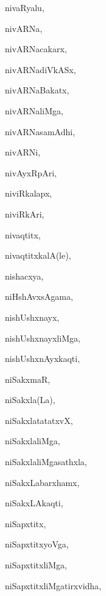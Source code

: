 \begin{multicols}{3}
{\noindent
{nivaRyalu}, \pageref{nivaRyalu}

\noindent
{nivARNa}, \pageref{nivARNa}

\noindent
{nivARNacakarx}, \pageref{nivARNacakarx}

\noindent
{nivARNadiVkASx}, \pageref{nivARNadiVkASx}

\noindent
{nivARNaBakatx}, \pageref{nivARNaBakatx}

\noindent
{nivARNaliMga}, \pageref{nivARNaliMga}

\noindent
{nivARNasamAdhi}, \pageref{nivARNasamAdhi}

\noindent
{nivARNi}, \pageref{nivARNi}

\noindent
{nivAyxRpAri}, \pageref{nivAyxRpAri}

\noindent
{niviRkalapx}, \pageref{niviRkalapx}

\noindent
{niviRkAri}, \pageref{niviRkAri}

\noindent
{nivaqtitx}, \pageref{nivaqtitx}

\noindent
{nivaqtitxkalA(le)}, \pageref{nivaqtitxkalAle}

\noindent
{nishacxya}, \pageref{nishacxya}

\noindent
{niHshAvxsAgama}, \pageref{niHshAvxsAgama}

\noindent
{nishUshxnayx}, \pageref{nishUshxnayx}

\noindent
{nishUshxnayxliMga}, \pageref{nishUshxnayxliMga}

\noindent
{nishUshxnAyxkaqti}, \pageref{nishUshxnAyxkaqti}

\noindent
{niSakxmaR}, \pageref{niSakxmaR}

\noindent
{niSakxla(La)}, \pageref{niSakxlaLa}

\noindent
{niSakxlatatatxvX}, \pageref{niSakxlatatatxvX}

\noindent
{niSakxlaliMga}, \pageref{niSakxlaliMga}

\noindent
{niSakxlaliMgasathxla}, \pageref{niSakxlaliMgasathxla}

\noindent
{niSakxLabarxhamx}, \pageref{niSakxLabarxhamx}

\noindent
{niSakxLAkaqti}, \pageref{niSakxLAkaqti}

\noindent
{niSapxtitx}, \pageref{niSapxtitx}

\noindent
{niSapxtitxyoVga}, \pageref{niSapxtitxyoVga}

\noindent
{niSapxtitxliMga}, \pageref{niSapxtitxliMga}

\noindent
{niSapxtitxliMgatirxvidha}, \pageref{niSapxtitxliMgatirxvidha}

}
\end{multicols}
